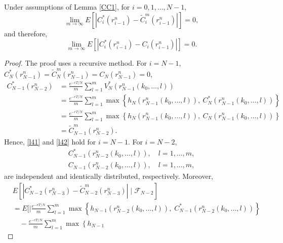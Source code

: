 \documentclass[reqno]{amsart}
\begin{document}
\begin{lemma}
\label{CC2}
Under assumptions of Lemma \ref{CC1}, for $i=0,1, \dots, N-1$,
 \begin{equation}
 \label{l41}
 \lim _{m \to \infty} E\left[\left|C_i^*\left(r_{i-1}^{n}\right)-\widetilde{C}_i^m\left(r_{i-1}^n\right)\right|\right]=0,
 \end{equation}
and therefore,
\begin{equation}
\label{l42}
 \lim _{m \to \infty} E\left[\left|C_i^*\left(r_{i-1}^{n}\right)-C_i\left(r_{i-1}^{n}\right)\right|\right]=0.
\end{equation}
\end{lemma}

\begin{proof}
The proof uses a recursive method. For $i=N-1$, 
$C_N^*\left(r_{N-1}^{n}\right)=\widetilde{C}_N^m\left(r_{N-1}^n\right)
=C_N\left(r_{N-1}^{n}\right)=0$,
\begin{align*}
 C_{N-1}^*\left(r_{N-2}^{n}\right)
 &= \frac{e^{-rT/N}}{m} \sum_{l=1}^{m} V_{N}^*\left(r_{N-1}^{n}\left(k_0,\dots,l\right)\right) \\
 &= \frac{e^{-rT/N}}{m} \sum_{l=1}^{m} \max \left\{h_N\left(r_{N-1}^{n}\left(k_0,\dots,l\right)\right), \ C_N^*\left(r_{N-1}^{n}\left(k_0,\dots,l\right)\right) \right\} \\
 &= \frac{e^{-rT/N}}{m} \sum_{l=1}^{m} \max \left\{h_N\left(r_{N-1}^{n}\left(k_0,\dots,l\right)\right), \ C_N\left(r_{N-1}^{n}\left(k_0,\dots,l\right)\right) \right\} \\
 &= \widetilde{C}_{N-1}^m\left(r_{N-2}^n\right).
\end{align*}
Hence, \eqref{l41} and \eqref{l42} hold for $i=N-1$. For $i=N-2$,
\begin{gather*}
 C_{N-1}^*\left(r_{N-2}^{n}\left(k_0,\dots,l\right)\right), \quad l=1,\dots,m,\\
 C_{N-1}\left(r_{N-2}^{n}\left(k_0,\dots,l\right)\right), \quad l=1,\dots,m,
\end{gather*}
are independent and identically distributed, respectively. Moreover,
\begin{align*}
& E\left[\left|C_{N-2}^*\left(r_{N-3}^{n}\right)-\widetilde{C}_{N-2}^m\left(r_{N-3}^n\right)\right| \mid \mathcal{F}_{N-2}\right] \\
&=  E\Big[\Big| \frac{e^{-rT/N}}{m} \sum_{l=1}^{m} \max \left\{h_{N-1}
 \left(r_{N-2}^{n}\left(k_0,\dots,l\right)\right), \;
  C_{N-1}^*\left(r_{N-2}^{n}\left(k_0,\dots,l\right)\right)\right\} \\
&\quad -\frac{e^{-rT/N}}{m} \sum_{l=1}^{m} \max \left\{h_{N-1}

\end{align*}
\end{proof}
\end{document}
